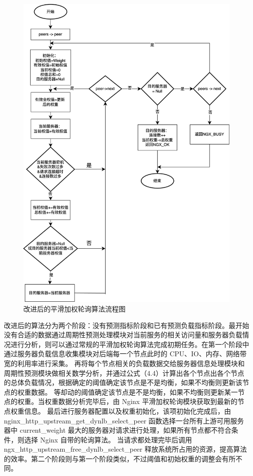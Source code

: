 \begin{figure}[htbp]
  \centering
  \includegraphics[width=\textwidth]{figures/new_smoth_weight_balance.jpg}
  \caption{改进后的平滑加权轮询算法流程图}
  \label{new_smoth_weight_balance}
\end{figure}

改进后的算法分为两个阶段：没有预测指标阶段和已有预测负载指标阶段。最开始没有合适的数据通过周期性预测处理模块对当前服务的相关访问量和服务器负载情况进行分析，则可以通过常规的平滑加权轮询算法完成初期任务。在第一个阶段中通过服务器负载信息收集模块对后端每一个节点此时的 CPU、IO、内存、网络带宽的利用率进行采集。
再将每个节点相关的负载数据交给服务器信息处理模块和周期性预测模块做相关数学分析，并通过公式（4.4）计算出各个节点出各个节点的总体负载情况，根据确定的阈值确定该节点是不是均衡，如果不均衡则更新该节点的权重数据。
等却动的阈值确定该节点是不是均衡，如果不均衡则更新某一节点的权重。当权重数据分析完毕后，由 Nginx 平滑加权轮询模块获取到最新的节点权重信息。
最后进行服务器配置以及权重初始化，该项初始化完成后，由 nginx\_http\_upstream\_get\_dynlb\_select\_peer 函数选择一台所有上游可用服务器中 current\_weight 最大的服务器对请求进行处理，如果所有节点都不符合条件，则选择 Nginx 自带的轮询算法。
当请求都处理完毕后调用 ngx\_http\_upstream\_free\_dynlb\_select\_peer 释放系统所占用的资源，提高算法的效率。第二个阶段则与第一个阶段类似，不过阈值和初始权重的调整会有所不同。

